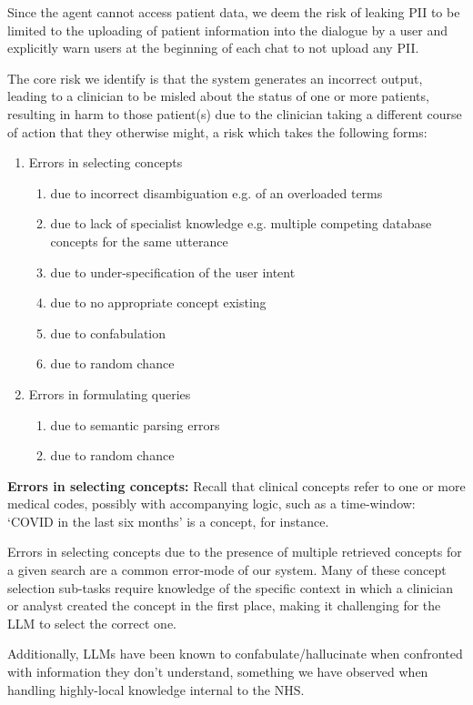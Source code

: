 \documentclass[11pt]{article}
\begin{document}
Since the agent cannot access patient data, we deem the risk of leaking PII to be limited to the uploading of patient information into the dialogue by a user and explicitly warn users at the beginning of each chat to not upload any PII.

The core risk we identify is that the system generates an incorrect output, leading to a clinician to be misled about the status of one or more patients, resulting in harm to those patient(s) due to the clinician taking a different course of action that they otherwise might, a risk which takes the following forms:

\begin{enumerate}
	\item Errors in selecting concepts
	\begin{enumerate}
		\item due to incorrect disambiguation e.g. of an overloaded terms
		\item due to lack of specialist knowledge e.g. multiple competing database concepts for the same utterance   
		\item due to under-specification of the user intent
		\item due to no appropriate concept existing 
		\item due to confabulation
		\item due to random chance
	\end{enumerate}
	\item Errors in formulating queries
	\begin{enumerate}
		\item due to semantic parsing errors 
		\item due to random chance
	\end{enumerate}
\end{enumerate}

\textbf{Errors in selecting concepts:}
Recall that clinical concepts refer to one or more medical codes, possibly with accompanying logic, such as a time-window: `COVID in the last six months' is a concept, for instance.

Errors in selecting concepts due to the presence of multiple retrieved concepts for a given search are a common error-mode of our system. Many of these concept selection sub-tasks require knowledge of the specific context in which a clinician or analyst created the concept in the first place, making it challenging for the LLM to select the correct one.

Additionally, LLMs have been known to confabulate/hallucinate when confronted with information they don't understand, something we have observed when handling highly-local knowledge internal to the NHS.
\end{document}
